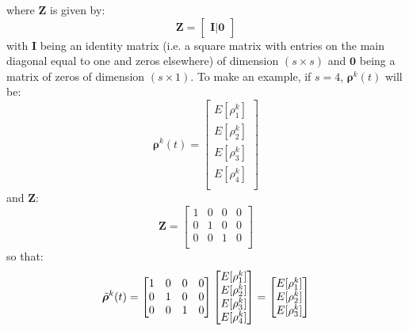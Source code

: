 \documentclass[\main/main.tex]{subfiles}
\begin{document}
where $\mathbf{Z}$ is given by:
\begin{equation}
\mathbf{Z}=
    \begin{bmatrix}
    \mathbf{I} | \mathbf{0}
    \end{bmatrix}
\end{equation}
with $\mathbf{I}$ being an identity matrix (i.e. a square matrix with entries on the main diagonal equal to one and zeros elsewhere)  of dimension $(s \times s) $ and $\mathbf{0}$ being a matrix of zeros of dimension $(s \times 1) $.
To make an example, if $s = 4$,  $\bm{\rho}^k(t)$ will be:
\begin{equation}
\bm{\rho}^k(t) =
\begin{bmatrix}
E[\rho^k_1]\\
E[\rho^k_2]\\
E[\rho^k_{3}]\\
E[\rho^k_{4}]\\
\end{bmatrix}
\end{equation}
and $\mathbf{Z}$:
\begin{equation}
\mathbf{Z}=
    \begin{bmatrix}
   1 & 0 & 0 & 0\\
    0 & 1 & 0 & 0\\
     0 & 0 & 1 & 0\\
    \end{bmatrix}
\end{equation}
so that:
\begin{equation}
\Tilde{\bm{\rho}}^k(t) =
    \begin{bmatrix}
   1 & 0 & 0 & 0\\
    0 & 1 & 0 & 0\\
     0 & 0 & 1 & 0\\
    \end{bmatrix}
    \begin{bmatrix}
E[\rho^k_1]\\
E[\rho^k_2]\\
E[\rho^k_{3}]\\
E[\rho^k_{4}]\\
\end{bmatrix} = 
\begin{bmatrix}
E[\rho^k_1]\\
E[\rho^k_2]\\
E[\rho^k_{3}]\\
\end{bmatrix}
\end{equation}
\end{document}
